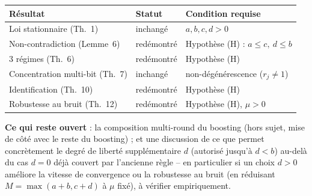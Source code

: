 \documentclass[12pt,a4paper]{article}
\theoremstyle{remark}
\begin{document}
\begin{center}
\renewcommand{\arraystretch}{1.3}
\begin{tabular}{lll}
\toprule
Résultat & Statut & Condition requise \\
\midrule
Loi stationnaire (Th.~1) & inchangé & $a,b,c,d>0$ \\
Non-contradiction (Lemme~6) & redémontré & Hypothèse (H) : $a\le c,\ d\le b$ \\
3 régimes (Th.~6) & redémontré & Hypothèse (H) \\
Concentration multi-bit (Th.~7) & inchangé & non-dégénérescence ($r_j\ne1$) \\
Identification (Th.~10) & redémontré & Hypothèse (H) \\
Robustesse au bruit (Th.~12) & redémontré & Hypothèse (H), $\mu>0$ \\
\bottomrule
\end{tabular}
\end{center}

\textbf{Ce qui reste ouvert} : la composition multi-round du boosting (hors
sujet, mise de côté avec le reste du boosting) ; et une discussion de ce que
permet concrètement le degré de liberté supplémentaire $d$ (autorisé jusqu'à
$d<b$) au-delà du cas $d=0$ déjà couvert par l'ancienne règle -- en
particulier si un choix $d>0$ améliore la vitesse de convergence ou la
robustesse au bruit (en réduisant $M=\max(a+b,c+d)$ à $\mu$ fixé), à vérifier
empiriquement.
\end{document}
